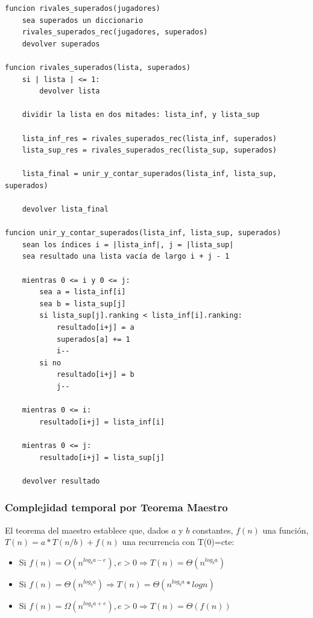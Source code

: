 \documentclass[titlepage,a4paper]{article}
\begin{document}
\begin{verbatim}
funcion rivales_superados(jugadores)
    sea superados un diccionario
    rivales_superados_rec(jugadores, superados)
    devolver superados

funcion rivales_superados(lista, superados)
    si | lista | <= 1:
        devolver lista

    dividir la lista en dos mitades: lista_inf, y lista_sup

    lista_inf_res = rivales_superados_rec(lista_inf, superados)
    lista_sup_res = rivales_superados_rec(lista_sup, superados)

    lista_final = unir_y_contar_superados(lista_inf, lista_sup, superados)

    devolver lista_final

funcion unir_y_contar_superados(lista_inf, lista_sup, superados)
    sean los índices i = |lista_inf|, j = |lista_sup|
    sea resultado una lista vacía de largo i + j - 1
    
    mientras 0 <= i y 0 <= j:
        sea a = lista_inf[i]
        sea b = lista_sup[j]
        si lista_sup[j].ranking < lista_inf[i].ranking:
            resultado[i+j] = a
            superados[a] += 1
            i--
        si no
            resultado[i+j] = b
            j--

    mientras 0 <= i:
        resultado[i+j] = lista_inf[i]

    mientras 0 <= j:
        resultado[i+j] = lista_sup[j]

    devolver resultado
\end{verbatim}

\subsubsection{Complejidad temporal por Teorema Maestro}
\label{sec:org90d106d}

El teorema del maestro establece que, dados \(a\) y \(b\) constantes, \(f(n)\) una función, \(T(n) = a * T(n/b) + f(n)\) una recurrencia con T(0)=cte:
\begin{itemize}
\item Si \(f(n) = O(n^{log_b a - e}), e > 0 \Rightarrow T(n) = \Theta(n^{log_b a})\)
\item Si \(f(n) = \Theta(n^{log_b a}) \Rightarrow T(n) = \Theta(n^{log_b a} * log n)\)
\item Si \(f(n) = \Omega(n^{log_b a + e}), e > 0 \Rightarrow T(n) = \Theta(f(n))\)
\end{itemize}
\end{document}
